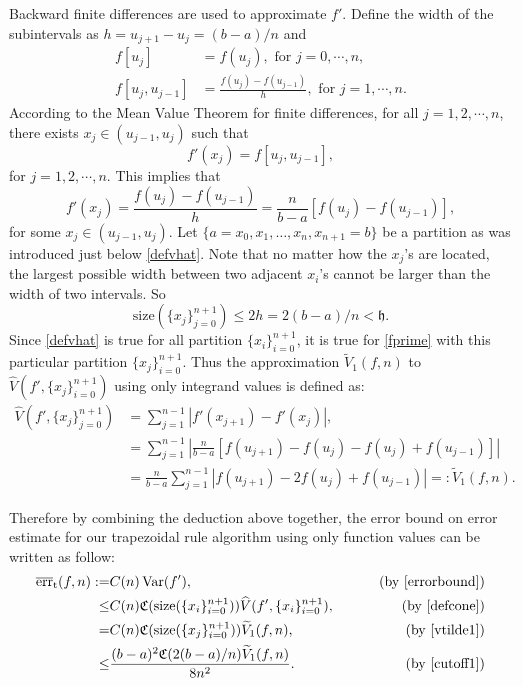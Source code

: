 \documentclass{iitthesis}
\DeclareMathOperator{\Var}{Var}
\theoremstyle{definition}
\theoremstyle{remark}
\begin{document}

Backward finite differences are used to approximate $f'$. Define the width of the subintervals as $h=u_{j+1}-u_{j}=(b-a)/n$ and
\begin{align*}
  f[u_{j}]&=f(u_{j}), \text{ for } j=0,\cdots, n,\\
  f[u_{j},u_{j-1}]&=\frac{f(u_{j})-f(u_{j-1})}{h},\text{ for } j=1, \cdots, n.
\end{align*}
According to the Mean Value Theorem for finite differences, for all $j=1,2,\cdots,n$, there exists $x_j\in (u_{j-1},u_{j})$ such that
\begin{equation*}
   f'(x_j)= f[u_{j},u_{j-1}],
\end{equation*}
for $j = 1, 2, \cdots, n.$ This implies that
\begin{equation}\label{fprime}
  f'(x_j)=\frac{f(u_{j})-f(u_{j-1})}{h}=\frac{n}{b-a}[f(u_{j})-f(u_{j-1})],
\end{equation}
for some $x_j\in (u_{j-1},u_{j})$. Let $\{a=x_{0}, x_{1},\ldots,x_{n},x_{n+1}=b\}$ be a partition as was introduced just below \eqref{defvhat}. Note that no matter how the $x_j$'s are located, the largest possible width between two adjacent $x_{i}$'s cannot be larger than the width of two intervals. So
\begin{equation}\label{cutoff1}
  \text{size}(\{x_j\}_{j=0}^{n+1})\leq 2h=2(b-a)/n<\mathfrak{h}.
\end{equation}
Since \eqref{defvhat} is true for all partition $\{x_i\}_{i=0}^{n+1}$, it is true for \eqref{fprime} with this particular partition $\{x_j\}_{i=0}^{n+1}$. Thus the approximation $\widetilde{V}_1(f,n)$ to $\widehat{V}(f',\{x_j\}_{i=0}^{n+1})$ using only integrand values is defined as:
\begin{align}\label{vtilde1}
\nonumber    \widehat{V}(f',\{x_j\}_{j=0}^{n+1})&= \sum_{j=1}^{n-1}\left|f'(x_{j+1})-f'(x_{j})\right|,\\
\nonumber    &=\sum_{j=1}^{n-1}\left|\frac{n}{b-a}[f(u_{j+1})-f(u_{j})-f(u_{j})+f(u_{j-1})]\right|\\
    &=\frac{n}{b-a}\sum_{j=1}^{n-1}\left|f(u_{j+1})-2f(u_{j})+f(u_{j-1})\right|=:\widetilde{V}_1(f,n).
\end{align}

Therefore by combining the deduction above together, the error bound on error estimate for our trapezoidal rule algorithm using only function values can be written as follow:
\begin{align*}
\overline{\text{err}}_{\text{t}}(f,n):=&C(n)\Var(f'),\qquad &\text{ (by \eqref{errorbound})}\\
\leq & C(n)\mathfrak{C}(\text{size}(\{x_i\}_{i=0}^{n+1}))\widehat{V}(f',\{x_i\}_{i=0}^{n+1}), \qquad &\text{ (by \eqref{defcone})}\\
=& C(n)\mathfrak{C}(\text{size}(\{x_j\}_{i=0}^{n+1}))\widetilde{V}_1(f,n), \qquad &\text{ (by \eqref{vtilde1})}\\
  \leq & \frac{(b-a)^2\mathfrak{C}(2(b-a)/n)\widetilde{V}_1(f,n)}{8n^2}.\qquad &\text{ (by \eqref{cutoff1})}
\end{align*}
\end{document}
